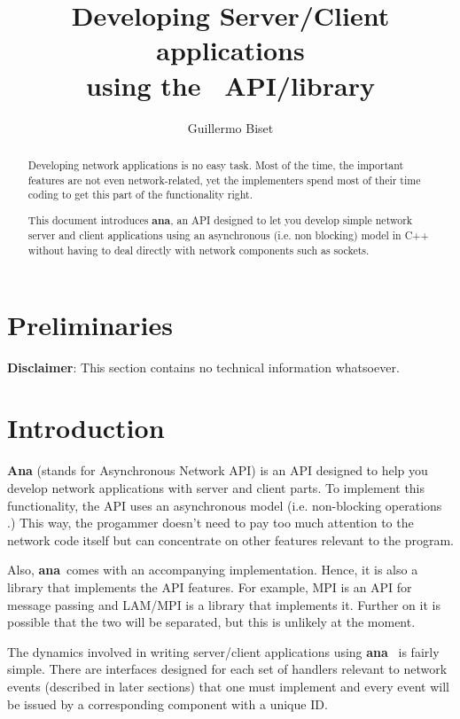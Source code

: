 \documentclass[a4paper,12pt,english]{article}
\title{Developing Server/Client applications \\
using the \ana \ API/library}
\author{Guillermo Biset}
\newcommand{\ana}{\textbf{ana}}
\begin{document}
\maketitle

\vfill

\begin{abstract}
Developing network applications is no easy task. Most of the time, the
important features are not  even network-related, yet the implementers
spend most of their time coding  to get this part of the functionality
right.

This  document introduces  \ana, an  API designed  to let  you develop
simple network  server and  client applications using  an asynchronous
(i.e. non blocking) model in  C++ without having to deal directly with
network components such as sockets.

\end{abstract}

\newpage

\tableofcontents

\newpage

\section{Preliminaries}

\textbf{Disclaimer}: This section contains no technical information
whatsoever.

\section{Introduction}

\textbf{Ana} (stands for Asynchronous  Network API) is an API designed
to help you develop network applications with server and client parts.
To implement  this functionality, the  API uses an  asynchronous model
(i.e.  non-blocking operations .) This way, the progammer doesn't need
to  pay  too  much  attention  to  the network  code  itself  but  can
concentrate on other features relevant to the program.

Also, \ana \ comes with  an accompanying implementation.  Hence, it is
also a library that implements  the API features.  For example, MPI is
an API  for message passing and  LAM/MPI is a  library that implements
it. Further on it is possible that the two will be separated, but this
is unlikely at the moment.

The dynamics involved in writing server/client applications using \ana
\ is  fairly simple.   There are interfaces  designed for each  set of
handlers relevant to network events (described in later sections) that
one must implement  and every event will be  issued by a corresponding
component with a unique ID.
\end{document}
